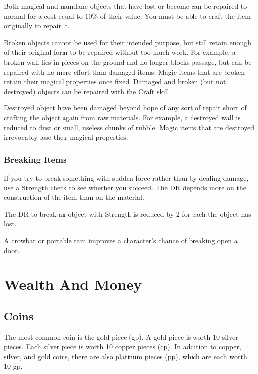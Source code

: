             Both magical and mundane objects that have lost  or become  can be repaired to normal for a cost equal to 10\% of their value.
            You must be able to craft the item originally to repair it.

            \label{Broken Objects}
            Broken objects cannot be used for their intended purpose, but still retain enough of their original form to be repaired without too much work. For example, a broken wall lies in pieces on the ground and no longer blocks passage, but can be repaired with no more effort than damaged items. Magic items that are broken retain their magical properties once fixed. Damaged and broken (but not destroyed) objects can be repaired with the Craft skill.

            \label{Destroyed Objects}
            Destroyed object have been damaged beyond hope of any sort of repair short of crafting the object again from raw materials.
            For example, a destroyed wall is reduced to dust or small, useless chunks of rubble.
            Magic items that are destroyed irrevocably lose their magical properties.

        \subsubsection{Breaking Items}
            If you try to break something with sudden force rather than by dealing damage, use a Strength check to see whether you succeed.
            The DR depends more on the construction of the item than on the material.

            The DR to break an object with Strength is reduced by 2 for each  the object has lost.

            A crowbar or portable ram improves a character's chance of breaking open a door.

\section{Wealth And Money}

    \subsection{Coins}
        The most common coin is the gold piece (gp). A gold piece is worth 10 silver pieces. Each silver piece is worth 10 copper pieces (cp). In addition to copper, silver, and gold coins, there are also platinum pieces (pp), which are each worth 10 gp.


